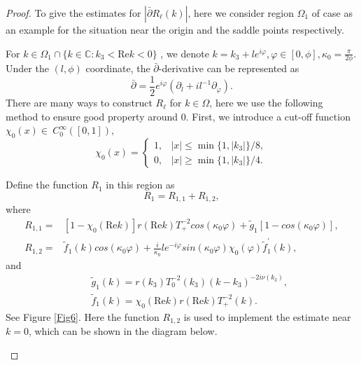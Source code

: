 \documentclass[11pt]{article}
\numberwithin{equation}{section}
\begin{document}
\begin{proof}
To give the estimates for $|\bar{\partial}R_{\ell}(k)|$, here we consider region $\Omega_{1}$ of case \uppercase\expandafter{} as an example for the situation near the origin and the saddle points respectively.

For $k\in\Omega_{1}\cap\{k\in\mathbb{C}:k_3<\mathrm{Re}k<0\}$ , we denote $k=k_3+l e^{i\varphi},\varphi \in\left[0,\phi\right],\kappa_0=\frac{\pi}{2\phi}$. Under the $(l,\phi)$ coordinate, the $\bar{\partial}$-derivative can be represented as
\begin{equation}
    \bar{\partial}=\frac{1}{2}e^{i\varphi}(\partial_l+il^{-1}\partial_\varphi).\label{eq10}
\end{equation}
There are many ways to construct $R_\ell$ for $k\in\Omega$, here we use the following method to ensure good property around $0$. First, we introduce a cut-off function  $\chi_0(x)\in\ C^{\infty}_0([0,1]),$
\begin{equation}
\chi_0(x)=\left\{\begin{array}{ll}
1,&|x|\leqslant \min\{1,|k_3|\}/8,\\
0,&|x|\geqslant \min\{1,|k_3|\}/4.
\end{array}\right.
\end{equation}

Define the function $R_{1}$ in this region as
\begin{equation*}
R_{1}=R_{1,1}+R_{1,2},
\end{equation*}
where
\begin{equation}
\begin{aligned}
R_{1,1}=&[1-\chi_0(\mathrm{Re}k)]r(\mathrm{Re}k)T_+^{-2}cos(\kappa_0\varphi)+\tilde{g}_{1}[1-cos(\kappa_0\varphi)],\\
R_{1,2}=&\tilde{f}_1(k)cos(\kappa_0\varphi)+\frac{i}{\kappa_0}l e^{-i\varphi}sin(\kappa_0\varphi)\chi_0(\varphi)\tilde{f}_1^\prime(k),
\end{aligned}
\end{equation}
and
\begin{eqnarray}
&&\tilde{g}_{1}(k)=r(k_3)T_0^{-2}(k_3)(k-k_3)^{-2i\nu(k_3)},\nonumber\\
&&\tilde{f}_1(k)=\chi_0(\mathrm{Re}k)r(\mathrm{Re}k)T_+^{-2}(k).\nonumber
\end{eqnarray}
See Figure \ref{Fig6}.
Here the function $R_{1,2}$ is used to implement the estimate near $k=0$, which can be shown in the diagram below.


\begin{figure}
    \centering
\end{figure}
\end{proof}
\end{document}

